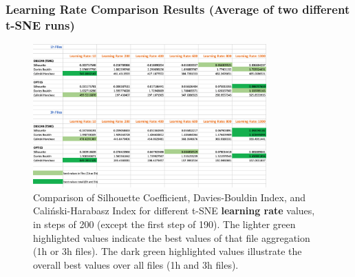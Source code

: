 \subsubsection{Learning Rate Comparison Results (Average of two different t-SNE runs)}
\label{appendix:compareAverageLearningRate}


\begin{figure}[H]
  \centering
  \includegraphics[width=0.8\textwidth]{./images/tsneParametersTest/learningRate/learningRateEvaluationScoresAverage.png}
  \caption{Comparison of Silhouette Coefficient, Davies-Bouldin Index, and Caliński-Harabasz Index for different t-SNE \textbf{learning rate} values, in steps of 200 (except the first step of 190). The lighter green highlighted values indicate the best values of that file aggregation (1h or 3h files). The dark green highlighted values illustrate the overall best values over all files (1h and 3h files).}
  \label{figure:learningRateEvaluationScoresAverage}
\end{figure}

